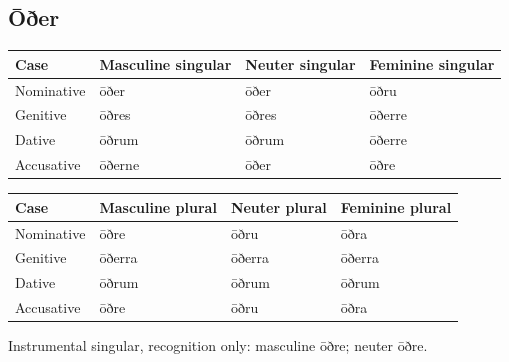 \subsection*{Ōðer}

\par\begingroup
\fontsize{10.5}{13.2}\selectfont
\setlength{\LTleft}{0pt}\setlength{\LTright}{\fill}
\noindent
\begin{tabular}{@{}>{\raggedright\arraybackslash}p{22.0mm}>{\raggedright\arraybackslash}p{31.188mm}>{\raggedright\arraybackslash}p{31.188mm}>{\raggedright\arraybackslash}p{31.188mm}@{}}
\toprule
\textbf{Case} & \textbf{Masculine singular} & \textbf{Neuter singular} & \textbf{Feminine singular} \\
\midrule
Nominative & ōðer & ōðer & ōðru \\
Genitive & ōðres & ōðres & ōðerre \\
Dative & ōðrum & ōðrum & ōðerre \\
Accusative & ōðerne & ōðer & ōðre \\
\bottomrule
\end{tabular}
\par\endgroup
\par\addvspace{5pt}
\par\begingroup
\fontsize{10.5}{13.2}\selectfont
\setlength{\LTleft}{0pt}\setlength{\LTright}{\fill}
\noindent
\begin{tabular}{@{}>{\raggedright\arraybackslash}p{22.0mm}>{\raggedright\arraybackslash}p{31.188mm}>{\raggedright\arraybackslash}p{31.188mm}>{\raggedright\arraybackslash}p{31.188mm}@{}}
\toprule
\textbf{Case} & \textbf{Masculine plural} & \textbf{Neuter plural} & \textbf{Feminine plural} \\
\midrule
Nominative & ōðre & ōðru & ōðra \\
Genitive & ōðerra & ōðerra & ōðerra \\
Dative & ōðrum & ōðrum & ōðrum \\
Accusative & ōðre & ōðru & ōðra \\
\bottomrule
\end{tabular}
\par\endgroup
Instrumental singular, recognition only: masculine ōðre; neuter ōðre.


